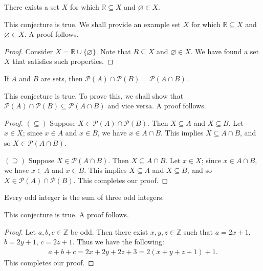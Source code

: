 \documentclass{exam}
\begin{document}
\begin{conjecture}{9.13}
    There exists a set $X$ for which $\mathbb R\subseteq X$ and $\varnothing\in X$.
\end{conjecture}

This conjecture is true. We shall provide an example set $X$ for which $\mathbb R\subseteq X$ and $\varnothing\in X$. A proof follows.
\begin{proof}
    Consider $X = \mathbb R\cup\{\varnothing\}$. Note that $R\subseteq X$ and $\varnothing\in X$. We have found a set $X$ that satisfies such properties.
\end{proof}

\begin{conjecture}{9.14}
    If $A$ and $B$ are sets, then $\mathscr P(A)\cap\mathscr P(B)=\mathscr P(A\cap B)$.
\end{conjecture}

This conjecture is true. To prove this, we shall show that $\mathscr P(A)\cap\mathscr P(B)\subseteq\mathscr P(A\cap B)$ and vice versa. A proof follows.

\begin{proof}
    $(\subseteq)$ Suppose $X\in\mathscr P(A)\cap\mathscr P(B)$. Then $X\subseteq A$ and $X\subseteq B$. Let $x\in X$; since $x\in A$ and $x\in B$, we have $x\in A\cap B$. This implies $X\subseteq A\cap B$, and so $X\in\mathscr P(A\cap B)$.

    $(\supseteq)$ Suppose $X\in\mathscr P(A\cap B)$. Then $X\subseteq A\cap B$. Let $x\in X$; since $x\in A\cap B$, we have $x\in A$ and $x\in B$. This implies $X\subseteq A$ and $X\subseteq B$, and so $X\in\mathscr P(A)\cap\mathscr P(B)$. This completes our proof.
\end{proof}

\begin{conjecture}{9.15}
    Every odd integer is the sum of three odd integers.
\end{conjecture}

This conjecture is true. A proof follows.

\begin{proof}
    Let $a, b, c\in\mathbb Z$ be odd. Then there exist $x,y,z\in\mathbb Z$ such that $a = 2x + 1$, $b=2y+1$, $c=2z + 1$. Thus we have the following:
    \begin{align*}
        a + b + c = 2x + 2y + 2z + 3 = 2(x + y + z + 1) + 1.
    \end{align*}
    This completes our proof.
\end{proof}
\end{document}
